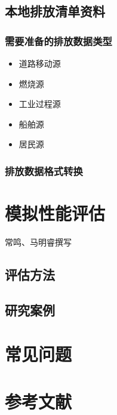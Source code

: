\documentclass{article}
\begin{document}
\subsection{本地排放清单资料}

\subsubsection{需要准备的排放数据类型}

\begin{itemize}

\item 道路移动源

\item 燃烧源

\item 工业过程源

\item 船舶源

\item 居民源

\end{itemize}

\subsubsection{排放数据格式转换}

\section{模拟性能评估}

{\color{red} 常鸣、马明睿撰写}

\subsection{评估方法}

\subsection{研究案例}

\section{常见问题}

\section{参考文献}

\end{document}
